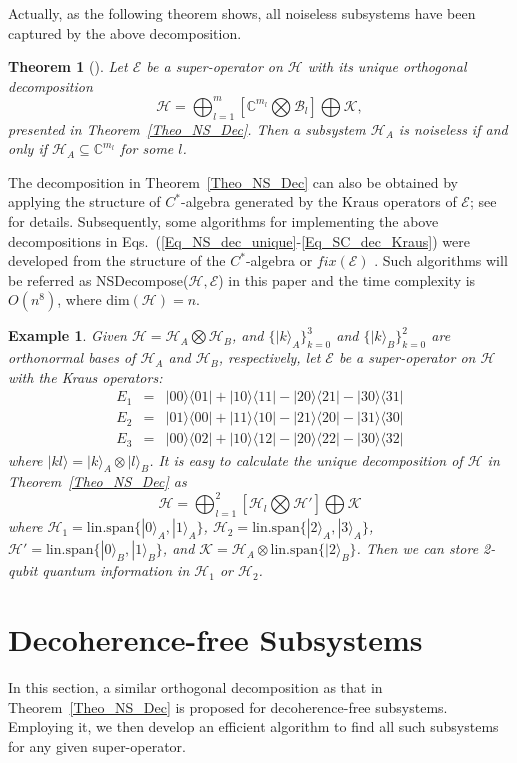 \documentclass[journal]{IEEEtran}
\def\h{\ensuremath{\mathcal{H}}}
\def\k{\ensuremath{\mathcal{K}}}
\def\b{\ensuremath{\mathcal{B}}}
\def\e{\ensuremath{\mathcal{E}}}
\def\k{\mathcal{K}}
\newtheorem{theorem}{Theorem}
\newtheorem{example}{Example}
\begin{document}
Actually, as the following theorem shows, all noiseless subsystems have been captured by the above decomposition.
\begin{theorem}[\cite{blume2010information}]
  Let $\e$ be a super-operator on $\h$ with its unique orthogonal decomposition
   $$\h=\bigoplus_{l=1}^m\left[\mathbb{C}^{m_l}\bigotimes\b_l\right]\bigoplus\k,$$
   presented in Theorem~\ref{Theo_NS_Dec}. Then
    a subsystem $\h_A$ is noiseless if and only if $\h_A\subseteq \mathbb{C}^{m_l}$ for some $l$.
\end{theorem}

The decomposition in Theorem~\ref{Theo_NS_Dec} can also be obtained by applying the structure of  $C^*$-algebra generated by the Kraus operators of $\e$; see \cite{choi2006method} for details. Subsequently, some algorithms for implementing the above decompositions in Eqs.~(\ref{Eq_NS_dec_unique}-\ref{Eq_SC_dec_Kraus}) were developed from the structure of the $C^*$-algebra   or $fix(\e)$   \cite{guan2016decomposition,knill2006protected,wang2013numerical}.  Such algorithms will be referred as NSDecompose($\h,\e$) in this paper and the time complexity is $O(n^{8})$, where dim$(\h)=n$. 

\begin{example}
  Given $\h=\h_A\bigotimes \h_B$, and $\{|k\rangle_A\}_{k=0}^3$ and $\{|k\rangle_B\}_{k=0}^2$ are orthonormal bases of $\h_A$ and $\h_B$, respectively, let $\e$ be a super-operator on $\h$ with the Kraus operators:
  \begin{eqnarray*}
    E_{1}&=&|00\rangle\langle01|+|10\rangle\langle11|-|20\rangle\langle21|-|30\rangle\langle31|\\
    E_{2}&=&|01\rangle\langle00|+|11\rangle\langle10|-|21\rangle\langle20|-|31\rangle\langle30|\\
    E_{3}&=&|00\rangle\langle02|+|10\rangle\langle12|-|20\rangle\langle22|-|30\rangle\langle32|
  \end{eqnarray*}
  where $|kl\rangle=|k\rangle_A\otimes |l\rangle_B$. It is easy to calculate the unique decomposition of $\h$ in Theorem~\ref{Theo_NS_Dec} as 
  $$\h=\bigoplus_{l=1}^2\left[\h_l\bigotimes \h'\right] \bigoplus\k$$
  where $\h_1=\textrm{lin.span}\{|0\rangle_A,|1\rangle_A\}$, $\h_2=\textrm{lin.span}\{|2\rangle_A,|3\rangle_A\}$, $\h'=\textrm{lin.span}\{|0\rangle_B,|1\rangle_B\}$, and $\k = \h_A\otimes \textrm{lin.span}\{|2\rangle_B\}$. Then we can store 2-qubit quantum information in $\h_1$ or $\h_2$.
\end{example}

\section{Decoherence-free Subsystems}
In this section, a similar orthogonal decomposition as that in Theorem~\ref{Theo_NS_Dec} is proposed for decoherence-free subsystems. Employing it, we then develop an efficient algorithm to find all such subsystems for any given super-operator. 
\end{document}

